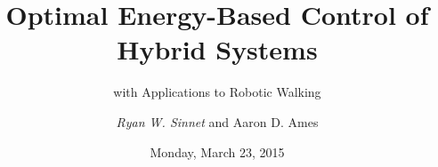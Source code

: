\documentclass{beamer}
\title[Energy Shaping]{Optimal Energy-Based Control of Hybrid Systems}
\subtitle{with Applications to Robotic Walking}
\author{\emph{Ryan W. Sinnet} and Aaron D. Ames}
\institute{Department of Mechanical Engineering\\ Texas A\&M University}
\date{Monday, March 23, 2015}
\begin{document}
\frame{\titlepage}







\end{document}
